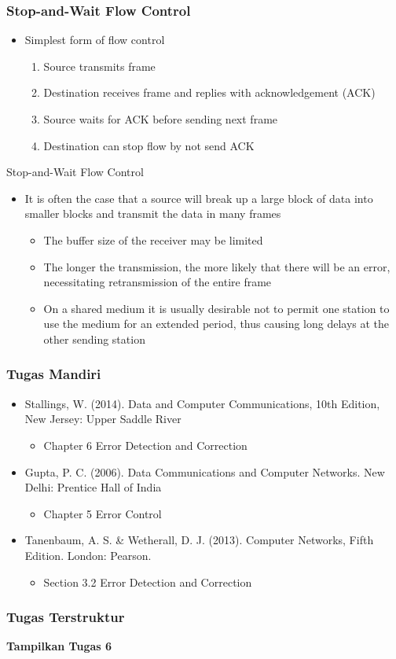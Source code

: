 \documentclass[pdflatex,compress]{beamer}
\begin{document}
\begin{frame}
	\frametitle{Stop-and-Wait Flow Control}
	\begin{itemize}
		\item Simplest form of flow control
		\begin{enumerate}
			\item Source transmits frame
			\item Destination receives frame and replies with acknowledgement (ACK)
			\item Source waits for ACK before sending next frame
			\item Destination can stop flow by not send ACK
		\end{enumerate}
	\end{itemize}
\end{frame}

\begin{frame}{Stop-and-Wait Flow Control}
	\begin{itemize}
		\item It is often the case that a source will break up a large block of data into smaller blocks and transmit the data in many frames
		\begin{itemize}
			\item The buffer size of the receiver may be limited
			\item The longer the transmission, the more likely that there will be an error, necessitating retransmission of the entire frame
			\item On a shared medium it is usually desirable not to permit one station to use the medium for an extended period, thus causing long delays at the other sending station
		\end{itemize}
	\end{itemize}
\end{frame}

\begin{frame}
	\frametitle{Tugas Mandiri}
	\begin{itemize}
		\item Stallings, W. (2014). Data and Computer Communications, 10th Edition, New Jersey: Upper Saddle River
		\begin{itemize}
			\item Chapter 6 Error Detection and Correction
		\end{itemize}
		\item Gupta, P. C. (2006). Data Communications and Computer Networks. New Delhi: Prentice Hall of India
		\begin{itemize}
			\item Chapter 5 Error Control
		\end{itemize}
		\item Tanenbaum, A. S. \& Wetherall, D. J. (2013). Computer Networks, Fifth Edition. London: Pearson.
		\begin{itemize}
			\item Section 3.2 Error Detection and Correction
		\end{itemize}
	\end{itemize}
\end{frame}

\begin{frame}
	\frametitle{Tugas Terstruktur}
	\textbf{Tampilkan Tugas 6}
\end{frame}
\end{document}
